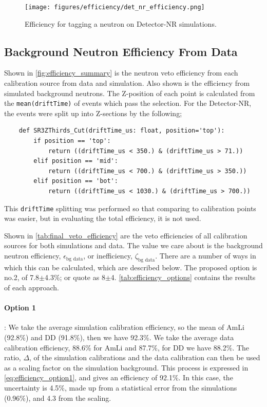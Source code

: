 \begin{figure}
    \centering
    \texttt{[image: figures/efficiency/det\_nr\_efficiency.png]}
    \caption{Efficiency for tagging a neutron on Detector-NR simulations.}
    \label{fig:detector_nr_efficiency}
\end{figure}

\clearpage
\subsection{Background Neutron Efficiency From Data}
Shown in \autoref{fig:efficiency_summary} is the neutron veto efficiency from each calibration source from data and simulation.
Also shown is the efficiency from simulated background neutrons.
The Z-position of each point is calculated from the \lstinline{mean(driftTime)} of events which pass the selection.
For the Detector-NR, the events were split up into Z-sections by the following;
\begin{lstlisting}
    def SR3ZThirds_Cut(driftTime_us: float, position='top'):
        if position == 'top':
            return ((driftTime_us < 350.) & (driftTime_us > 71.))
        elif position == 'mid':
            return ((driftTime_us < 700.) & (driftTime_us > 350.))
        elif position == 'bot':
            return ((driftTime_us < 1030.) & (driftTime_us > 700.))
\end{lstlisting}
This \lstinline{driftTime} splitting was performed so that comparing to calibration points was easier, but in evaluating the total efficiency, it is not used.

Shown in \autoref{tab:final_veto_efficiency} are the veto efficiencies of all calibration sources for both simulations and data.
The value we care about is the background neutron efficiency, $\epsilon_{\textrm{bg data}}$, or inefficiency, $\zeta_{\textrm{bg data}}$.
There are a number of ways in which this can be calculated, which are described below.
The proposed option is no.2, of 7.8$\pm$4.3\%; or quote as 8$\pm$4.
\autoref{tab:efficiency_options} contains the results of each approach.

\paragraph{Option 1}:
We take the average simulation calibration efficiency, so the mean of AmLi (92.8\%) and DD (91.8\%), then we have 92.3\%.
We take the average data calibration efficiency, 88.6\% for AmLi and 87.7\%, for DD we have 88.2\%.
The ratio, $\Delta$, of the simulation calibrations and the data calibration can then be used as a scaling factor on the simulation background.
This process is expressed in \autoref{eq:efficiency_option1}, and gives an efficiency of 92.1\%.
In this case, the uncertainty is 4.5\%, made up from a statistical error from the simulations (0.96\%), and 4.3 from the scaling.

